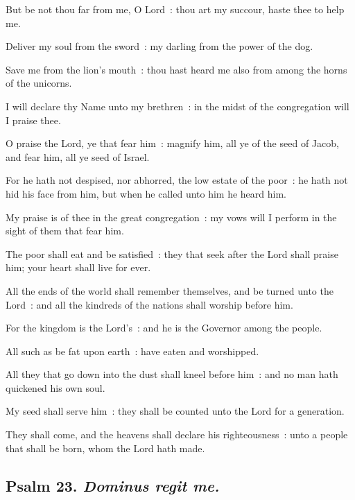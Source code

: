 But be not thou far from me, O Lord~: thou art my succour, haste thee to help me.\par
{}Deliver my soul from the sword~: my darling from the power of the dog.\par
{}Save me from the lion's mouth~: thou hast heard me also from among the horns of the unicorns.\par
{}I will declare thy Name unto my brethren~: in the midst of the congregation will I praise thee.\par
{}O praise the Lord, ye that fear him~: magnify him, all ye of the seed of Jacob, and fear him, all ye seed of Israel.\par
{}For he hath not despised, nor abhorred, the low estate of the poor~: he hath not hid his face from him, but when he called unto him he heard him.\par
{}My praise is of thee in the great congregation~: my vows will I perform in the sight of them that fear him.\par
{}The poor shall eat and be satisfied~: they that seek after the Lord shall praise him; your heart shall live for ever.\par
{}All the ends of the world shall remember themselves, and be turned unto the Lord~: and all the kindreds of the nations shall worship before him.\par
{}For the kingdom is the Lord's~: and he is the Governor among the people.\par
{}All such as be fat upon earth~: have eaten and worshipped.\par
{}All they that go down into the dust shall kneel before him~: and no man hath quickened his own soul.\par
{}My seed shall serve him~: they shall be counted unto the Lord for a generation.\par
{}They shall come, and the heavens shall declare his righteousness~: unto a people that shall be born, whom the Lord hath made.\par

\subsection{Psalm 23. \textit{Dominus regit me.}}

